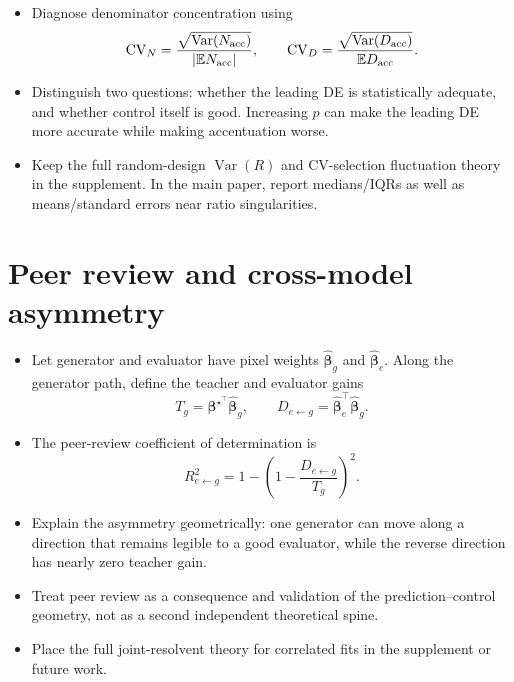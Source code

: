 \documentclass[11pt]{article}
\newcommand{\E}{\mathbb{E}}
\newcommand{\Var}{\operatorname{Var}}
\newcommand{\bhat}{\widehat{\bm\beta}}
\newcommand{\bstar}{\bm\beta^{\star}}
\begin{document}
\begin{itemize}
  \item Diagnose denominator concentration using
  \begin{equation}
    \mathrm{CV}_{N}
      =\frac{\sqrt{\Var(N_{\rm acc})}}{|\E N_{\rm acc}|},
    \qquad
    \mathrm{CV}_{D}
      =\frac{\sqrt{\Var(D_{\rm acc})}}{\E D_{\rm acc}}.
  \end{equation}
  \item Distinguish two questions: whether the leading DE is statistically
        adequate, and whether control itself is good. Increasing $p$ can make
        the leading DE more accurate while making accentuation worse.
  \item Keep the full random-design $\Var(R)$ and CV-selection fluctuation
        theory in the supplement. In the main paper, report medians/IQRs as
        well as means/standard errors near ratio singularities.
\end{itemize}

\section{Peer review and cross-model asymmetry}
\label{sec:peer-review}

\begin{itemize}
  \item Let generator and evaluator have pixel weights $\bhat_g$ and
        $\bhat_e$. Along the generator path, define the teacher and evaluator
        gains
  \begin{equation}
    T_g=\bstar^{\top}\bhat_g,
    \qquad
    D_{e\leftarrow g}=\bhat_e^{\top}\bhat_g.
  \end{equation}
  \item The peer-review coefficient of determination is
  \begin{equation}
    R_{e\leftarrow g}^{2}
      =1-\left(1-\frac{D_{e\leftarrow g}}{T_g}\right)^2.
    \label{eq:peer-r2}
  \end{equation}
  \item Explain the asymmetry geometrically: one generator can move along a
        direction that remains legible to a good evaluator, while the reverse
        direction has nearly zero teacher gain.
  \item Treat peer review as a consequence and validation of the
        prediction--control geometry, not as a second independent theoretical
        spine.
  \item Place the full joint-resolvent theory for correlated fits in the
        supplement or future work.
\end{itemize}
\end{document}
